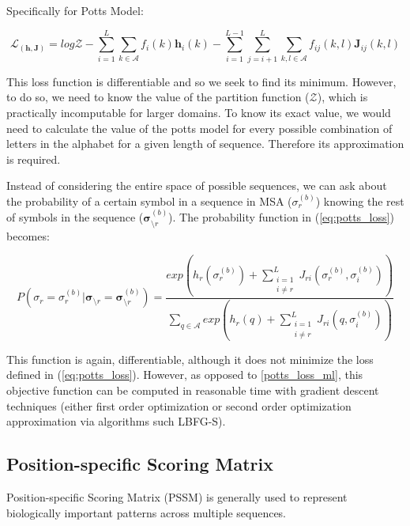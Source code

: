 Specifically for Potts Model: 
        
\begin{equation}
    \mathcal{L}_(\bm{h}, \bm{J}) = log \mathcal{Z} - \sum_{i = 1}^L \sum_{k \in \mathcal{A}} f_i(k)\bm{h}_i(k) - \sum_{i = 1}^{L-1} \sum_{j=i+1}^L \sum_{k, l \in \mathcal{A}} f_{ij}(k, l) \bm{J}_{ij}(k, l)
    \label{potts_loss_ml}
\end{equation}
        
This loss function is differentiable and so we seek to find its minimum. 
However, to do so, we need to know the value of the partition function ($\mathcal{Z}$), which is practically incomputable for larger domains. To know its exact value, we would need to calculate the value of the potts model for every possible combination of letters in the alphabet for a given length of sequence. 
Therefore its approximation is required.
        
Instead of considering the entire space of possible sequences, we can ask about the probability of a certain symbol in a sequence in MSA ($\sigma_r^{(b)}$) knowing the rest of symbols in the sequence ($\bm{\sigma}_{\setminus r}^{(b)}$). 
The probability function in (\ref{eq:potts_loss}) becomes:
        
$$
P(\sigma_{r} = \sigma_r^{(b)} | \bm{\sigma}_{\setminus r} = \bm{\sigma}_{\setminus r}^{(b)}) = \frac{exp \left(h_r (\sigma_r^{(b)}) + \sum_{\substack{i = 1\\i\neq r}}^L J_{ri}(\sigma_r^{(b)}, \sigma_i^{(b)})\right)}{\sum_{q \in \mathcal{A}} exp \left(h_r(q) + \sum_{\substack{i = 1\\i\neq r}}^L J_{ri}(q, \sigma_i^{(b)})\right)}$$
        
This function is again, differentiable, although it does not minimize the loss defined in (\ref{eq:potts_loss}).
However, as opposed to \ref{potts_loss_ml}, this objective function can be computed in reasonable time with gradient descent techniques (either first order optimization or second order optimization approximation via algorithms such LBFG-S)\cite{potts1, potts2}.
        
\subsection{Position-specific Scoring Matrix}

Position-specific Scoring Matrix (PSSM) is generally used to represent biologically important patterns across multiple sequences. 

